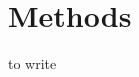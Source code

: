 \section{Methods}
\label{sec:methods}


to write

\cite{wagner2020ptb_xl}

\cite{ribeiro2020automatic}

\cite{Cardoso_2016_Sami-Trop}

\cite{torch_ecg_paper}
